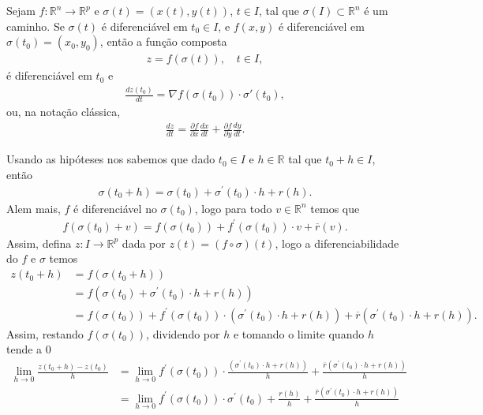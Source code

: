 \begin{homeworkProblem}[Seção 1-8]
  Sejam $f : \mathbb{R}^n \to \mathbb{R}^p$ e $\sigma(t)=(x(t),y(t))$, $t\in I$, tal que $\sigma(I)\subset \mathbb{R}^n$ é um caminho. Se $\sigma(t)$ é diferenciável em $t_0 \in I$, e $f(x,y)$ é diferenciável em $\sigma(t_0)=(x_0,y_0)$, então a função composta
  \begin{align*}    
    z = f(\sigma(t)), \quad t\in I,
  \end{align*}
  é diferenciável em $t_0$ e
  \begin{align*}
    \frac{dz(t_0)}{dt} = \nabla f(\sigma(t_0)) \cdot \sigma'(t_0),   
  \end{align*}
  ou, na notação clássica,
  \begin{align*}
    \frac{dz}{dt} = \frac{\partial f}{\partial x}\frac{dx}{dt} + \frac{\partial f}{\partial y}\frac{dy}{dt}.   
  \end{align*}
  \begin{solution}
    Usando as hipóteses nos sabemos que dado $t_0\in I$ e $h\in\mathbb{R}$ tal que $t_0+h\in I$, então 
    \begin{align*}
      \sigma(t_0+h)=\sigma(t_0)+\sigma^{\prime}(t_0)\cdot h+r(h). 
    \end{align*}
    Alem mais, $f$ é diferenciável no $\sigma(t_0)$, logo para todo $v\in\mathbb{R}^{n}$ temos que
    \begin{align*}
      f(\sigma(t_0)+v)=f(\sigma(t_0))+f^{\prime}(\sigma(t_0))\cdot v+\overline{r}(v).
    \end{align*}
    Assim, defina $z:I\to\mathbb{R}^{p}$ dada por $z(t)=(f\circ \sigma)(t)$, logo a diferenciabilidade do $f$ e $\sigma$ temos 
    \begin{align*}
      z(t_0+h)&=f(\sigma(t_0+h))\\
      &=f(\sigma(t_0)+\sigma^{\prime}(t_0)\cdot h+r(h))\\
      &=f(\sigma(t_0))+f^{\prime}(\sigma(t_0))\cdot(\sigma^{\prime}(t_0)\cdot h+r(h))+\overline{r}(\sigma^{\prime}(t_0)\cdot h+r(h)).
    \end{align*}
    Assim, restando $f(\sigma(t_0))$, dividendo por $h$ e tomando o limite quando $h$ tende a $0$
    \begin{align*}
      \lim_{h \to 0}\frac{z(t_0+h)-z(t_0)}{h}&=\lim_{h \to 0}f^{\prime}(\sigma(t_0))\cdot\frac{(\sigma^{\prime}(t_0)\cdot h+r(h))}{h}+\frac{\overline{r}(\sigma^{\prime}(t_0)\cdot h+r(h))}{h}\\
      &=\lim_{h \to 0}f^{\prime}(\sigma(t_0))\cdot\sigma^{\prime}(t_0)+\frac{r(h)}{h}+\frac{\overline{r}(\sigma^{\prime}(t_0)\cdot h+r(h))}{h}\\

\end{align*}
\end{solution}
\end{homeworkProblem}
